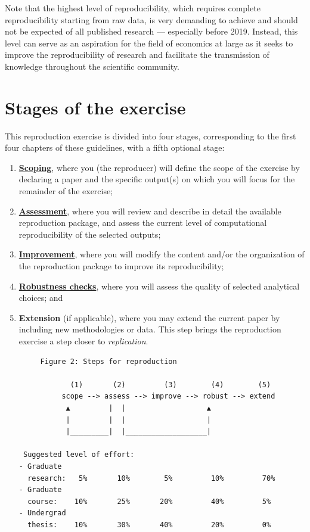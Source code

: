 \documentclass[]{book}
\begin{document}
Note that the highest level of reproducibility, which requires complete reproducibility starting from raw data, is very demanding to achieve and should not be expected of all published research --- especially before 2019. Instead, this level can serve as an aspiration for the field of economics at large as it seeks to improve the reproducibility of research and facilitate the transmission of knowledge throughout the scientific community.

\hypertarget{stages-of-the-exercise}{%
\section*{Stages of the exercise}\label{stages-of-the-exercise}}

This reproduction exercise is divided into four stages, corresponding to the first four chapters of these guidelines, with a fifth optional stage:

\begin{enumerate}
\def\labelenumi{\arabic{enumi}.}
\item
  \protect\hyperlink{scoping}{\textbf{Scoping}}, where you (the reproducer) will define the scope of the exercise by declaring a paper and the specific output(s) on which you will focus for the remainder of the exercise;\\
\item
  \protect\hyperlink{assessment}{\textbf{Assessment}}, where you will review and describe in detail the available reproduction package, and assess the current level of computational reproducibility of the selected outputs;
\item
  \protect\hyperlink{improvements}{\textbf{Improvement}}, where you will modify the content and/or the organization of the reproduction package to improve its reproducibility;\\
\item
  \protect\hyperlink{robust}{\textbf{Robustness checks}}, where you will assess the quality of selected analytical choices; and\\
\item
  \textbf{Extension} (if applicable), where you may extend the current paper by including new methodologies or data. This step brings the reproduction exercise a step closer to \emph{replication}.

\begin{verbatim}
     Figure 2: Steps for reproduction

            (1)       (2)         (3)        (4)        (5)
          scope --> assess --> improve --> robust --> extend
           ▲         |  |                   ▲
           |         |  |                   |
           |_________|  |___________________|

 Suggested level of effort:
- Graduate
  research:   5%       10%        5%         10%         70%
- Graduate
  course:    10%       25%       20%         40%         5%
- Undergrad
  thesis:    10%       30%       40%         20%         0%
\end{verbatim}
\end{enumerate}
\end{document}
